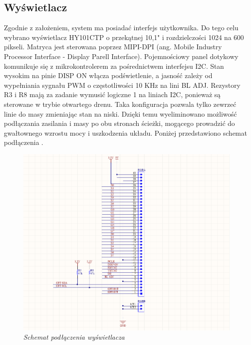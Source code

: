 \documentclass[eng,printmode]{mgr}
\begin{document}
\subsection*{Wyświetlacz}
Zgodnie z założeniem, system ma posiadać interfejs  użytkownika. Do tego celu wybrano wyświetlacz HY101CTP o przekątnej 10,1" i rozdzielczości 1024 na 600 pikseli. Matryca jest sterowana poprzez MIPI-DPI (ang. Mobile Industry Processor Interface - Display Parell Interface). Pojemnościowy panel dotykowy komunikuje się z mikrokontrolerem za pośrednictwem interfejsu I2C. Stan wysokim na pinie DISP ON włącza podświetlenie, a jasność zależy od wypełniania sygnału PWM o częstotliwości 10 KHz na lini BL ADJ.
Rezystory R3 i R8 mają za zadanie wymusić logiczne 1 na liniach I2C, ponieważ są sterowane w trybie otwartego drenu. Taka konfiguracja pozwala tylko zewrzeć linie do masy zmieniając stan na niski.
Dzięki temu wyeliminowano możliwość podłączania zasilania i masy po obu stronach ścieżki, mogącego prowadzić do gwałtownego wzrostu mocy i uszkodzenia układu. Poniżej przedstawiono schemat podłączenia \cite{dispDesign}.
\begin{figure}[!h]
    \centering
    \includegraphics[width=\textwidth]{schematics/display.png}
    \caption{\textit{ Schemat podłączenia wyświetlacza}}
\end{figure}
\end{document}
